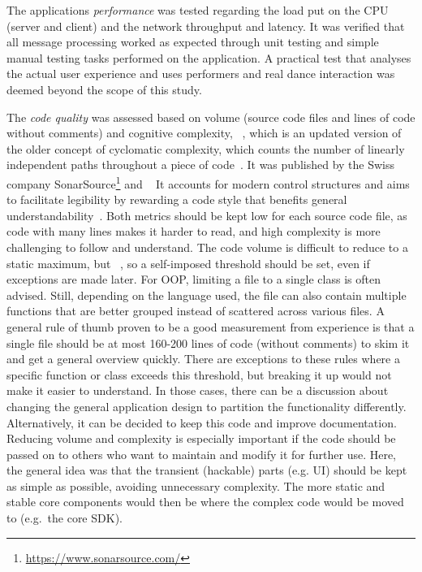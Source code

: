 The application\textquotesingle s \emph{performance} was tested regarding the load put on the \ac{CPU} (server and client) and the network throughput and latency.
It was verified that all message processing worked as expected through unit testing and simple manual testing tasks performed on the application.
A practical test that analyses the actual user experience and uses performers and real dance interaction was deemed beyond the scope of this study.

The \emph{code quality} was assessed based on volume (source code files and lines of code without comments) and cognitive complexity, ~\parencite[see][]{sonarSourceCognitiveComplexity}, which is an updated version of the older concept of cyclomatic complexity, which counts the number of linearly independent paths throughout a piece of code~\parencite[see][]{mcCabeComplexity}.
It was published by the Swiss company SonarSource\footnote{\url{https://www.sonarsource.com/}} and ~\parencite[4]{sonarSourceCognitiveComplexity}
It accounts for modern control structures and aims to facilitate legibility by rewarding a code style that benefits general understandability~\parencite[4]{sonarSourceCognitiveComplexity}.
Both metrics should be kept low for each source code file, as code with many lines makes it harder to read, and high complexity is more challenging to follow and understand.
The code volume is difficult to reduce to a static maximum, but ~\parencite[6]{softwareMetricsReliability}, so a self-imposed threshold should be set, even if exceptions are made later.
For \ac{OOP}, limiting a file to a single class is often advised.
Still, depending on the language used, the file can also contain multiple functions that are better grouped instead of scattered across various files.
A general rule of thumb proven to be a good measurement from experience is that a single file should be at most 160-200 lines of code (without comments) to skim it and get a general overview quickly.
There are exceptions to these rules where a specific function or class exceeds this threshold, but breaking it up would not make it easier to understand.
In those cases, there can be a discussion about changing the general application design to partition the functionality differently.
Alternatively, it can be decided to keep this code and improve documentation.
Reducing volume and complexity is especially important if the code should be passed on to others who want to maintain and modify it for further use.
Here, the general idea was that the transient (hackable) parts (e.g. \ac{UI}) should be kept as simple as possible, avoiding unnecessary complexity.
The more static and stable core components would then be where the complex code would be moved to (e.g.\ the core \ac{SDK}).

